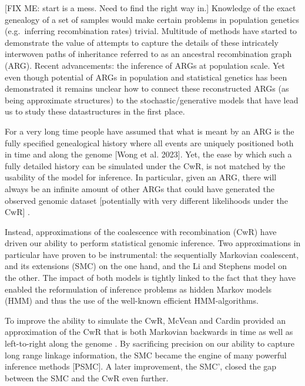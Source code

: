\documentclass{article}
\begin{document}

[FIX ME: start is a mess. Need to find the right way in.]
Knowledge of the exact genealogy of a set of samples would make certain problems 
in population genetics (e.g.\ inferring recombination rates) trivial. 
Multitude of methods have started to 
demonstrate the value of attempts to capture the details of these intricately 
interwoven paths of inheritance referred to as an ancestral recombination graph (ARG).
Recent advancements: the inference of ARGs at population scale.
Yet even though potential of ARGs in population and statistical genetics has been 
demonstrated it remains unclear how to connect these reconstructed ARGs 
(as being approximate structures) to 
the stochastic/generative models that have lead us to study these datastructures 
in the first place. 

For a very long time people have assumed that what is meant by an ARG is the 
fully specified genealogical history where all events are uniquely positioned 
both in time and along the genome [Wong et al. 2023].
Yet, the ease by which such a fully detailed history can be simulated under the 
CwR, is not matched by the usability of the model for inference. 
In particular, given an ARG, there will always be an infinite amount of other 
ARGs that could have generated the observed genomic dataset 
[potentially with very different likelihoods under the CwR]
\citep{mcvean_2005_approximating}.

Instead, approximations of the coalescence with recombination (CwR) have  
driven our ability to perform statistical genomic inference. Two approximations 
in particular have proven to be instrumental: the sequentially Markovian coalescent, 
and its extensions (SMC) on the one hand, and the Li and Stephens model on the other. 
The impact of both models is tightly linked to the fact that they have enabled 
the reformulation of inference problems as hidden Markov models (HMM) and thus 
the use of the well-known efficient HMM-algorithms.

To improve the ability to simulate the CwR, McVean and Cardin 
provided an approximation of the CwR that is both Markovian backwards in time 
as well as left-to-right along the genome \citep{mcvean_2005_approximating}. 
By sacrificing precision on our ability to capture long range linkage 
information, the SMC became the engine of many powerful inference methods [PSMC]. 
A later improvement, the SMC', closed the gap between the SMC and the 
CwR even further.
\end{document}
